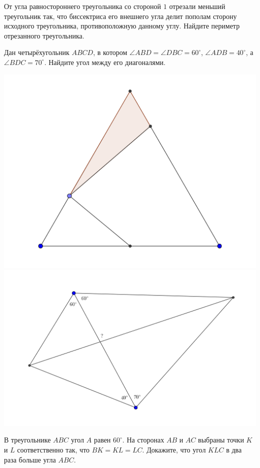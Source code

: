 \begin{problems}
\item От угла равностороннего треугольника со стороной $1$ отрезали меньший треугольник так, что биссектриса его внешнего угла делит пополам сторону исходного треугольника, противоположную данному углу. Найдите периметр отрезанного треугольника.

\newpage

\item Дан четырёхугольник $ABCD$, в котором $\angle ABD=\angle DBC=60^{\circ}$, $\angle ADB=40^{\circ}$, а $\angle BDC=70^{\circ}$. Найдите угол между его диагоналями.

\begin{center}
	\includegraphics[width=.45\textwidth]{incen03}
	\includegraphics[width=.45\textwidth]{incen04}
\end{center}

\item В треугольнике $ABC$ угол $A$ равен $60^{\circ}$. На сторонах $AB$ и $AC$ выбраны точки $K$ и $L$ соответственно так, что $BK = KL = LC$. Докажите, что угол $KLC$ в два раза больше угла $ABC$.


\end{problems}

\renewcommand{\baselinestretch}{1}
\parskip

